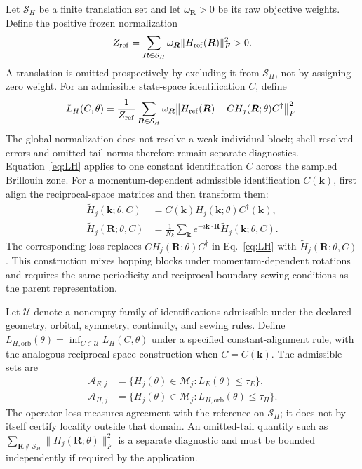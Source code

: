 \documentclass[11pt]{article}
\newcommand{\M}{\mathcal M}\newcommand{\A}{\mathcal A}\newcommand{\U}{\mathcal U}\newcommand{\HH}{\mathcal H}\newcommand{\SH}{\mathcal S_H}\newcommand{\Tr}{\operatorname{tr}}\newcommand{\dist}{\operatorname{dist}}\newcommand{\dd}{\mathrm d}
\begin{document}
Let $\SH$ be a finite translation set and let $\omega_{\bm R}>0$ be its raw objective weights. Define the positive frozen normalization
\begin{equation}
 Z_{\rm ref}=\sum_{\bm R\in\SH}\omega_{\bm R}
 \|H_{\rm ref}(\bm R)\|_F^2>0.
\end{equation}
A translation is omitted prospectively by excluding it from $\SH$, not by assigning zero weight. For an admissible state-space identification $C$, define
\begin{equation}\label{eq:LH}
 L_H(C,\theta)=\frac{1}{Z_{\rm ref}}
 \sum_{\bm R\in\SH}\omega_{\bm R}\big\|H_{\rm ref}(\bm R)-C H_j(\bm R;\theta)C^\dagger\big\|_F^2.
\end{equation}
The global normalization does not resolve a weak individual block; shell-resolved errors and omitted-tail norms therefore remain separate diagnostics. Equation~\eqref{eq:LH} applies to one constant identification $C$ across the sampled Brillouin zone. For a momentum-dependent admissible identification $C(\bm k)$, first align the reciprocal-space matrices and then transform them:
\begin{align}
\widetilde H_j(\bm k;\theta,C)&=C(\bm k)H_j(\bm k;\theta)C^\dagger(\bm k),\label{eq:k-dependent-alignment}\\
\widetilde H_j(\bm R;\theta,C)&=\frac{1}{N_k}\sum_{\bm k}e^{-i\bm k\cdot\bm R}\widetilde H_j(\bm k;\theta,C).\label{eq:k-dependent-transform}
\end{align}
The corresponding loss replaces $C H_j(\bm R;\theta)C^\dagger$ in Eq.~\eqref{eq:LH} with $\widetilde H_j(\bm R;\theta,C)$. This construction mixes hopping blocks under momentum-dependent rotations and requires the same periodicity and reciprocal-boundary sewing conditions as the parent representation.

Let $\U$ denote a nonempty family of identifications admissible under the declared geometry, orbital, symmetry, continuity, and sewing rules. Define $L_{H,\mathrm{orb}}(\theta)=\inf_{C\in\U}L_H(C,\theta)$ under a specified constant-alignment rule, with the analogous reciprocal-space construction when $C=C(\bm k)$. The admissible sets are
\begin{align}\label{eq:sets}
\A_{E,j}&=\{H_j(\theta)\in\M_j:L_E(\theta)\le\tau_E\},\\
\A_{H,j}&=\{H_j(\theta)\in\M_j:L_{H,\mathrm{orb}}(\theta)\le\tau_H\}.
\end{align}
The operator loss measures agreement with the reference on $\SH$; it does not by itself certify locality outside that domain. An omitted-tail quantity such as $\sum_{\bm R\notin\SH}\|H_j(\bm R;\theta)\|_F^2$ is a separate diagnostic and must be bounded independently if required by the application.
\end{document}
